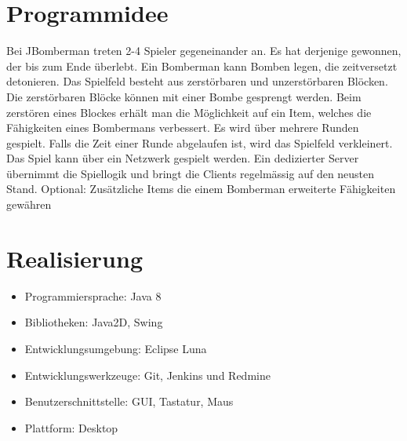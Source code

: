 \documentclass[11pt]{scrartcl}
\begin{document}
\section{Programmidee}
\label{sec:programmidee}
Bei JBomberman treten 2-4 Spieler gegeneinander an. Es hat derjenige gewonnen, der bis zum Ende überlebt. Ein Bomberman kann Bomben legen, die zeitversetzt detonieren. Das Spielfeld besteht aus zerstörbaren und unzerstörbaren Blöcken. Die zerstörbaren Blöcke können mit einer Bombe gesprengt werden. Beim zerstören eines Blockes erhält man die Möglichkeit auf ein Item, welches die Fähigkeiten eines Bombermans verbessert. Es wird über mehrere Runden gespielt. Falls die Zeit einer Runde abgelaufen ist, wird das Spielfeld verkleinert.
\newline Das Spiel kann über ein Netzwerk gespielt werden. Ein dedizierter Server übernimmt die Spiellogik und bringt die Clients regelmässig auf den neusten Stand.
\newline Optional: Zusätzliche Items die einem Bomberman erweiterte Fähigkeiten gewähren

\section{Realisierung}
\label{sec:realisierung}
\begin{itemize}
    \item Programmiersprache: Java 8
    \item Bibliotheken: Java2D, Swing
    \item Entwicklungsumgebung: Eclipse Luna
    \item Entwicklungswerkzeuge: Git, Jenkins und Redmine
    \item Benutzerschnittstelle: GUI, Tastatur, Maus
    \item Plattform: Desktop
\end{itemize}


 
\end{document}
